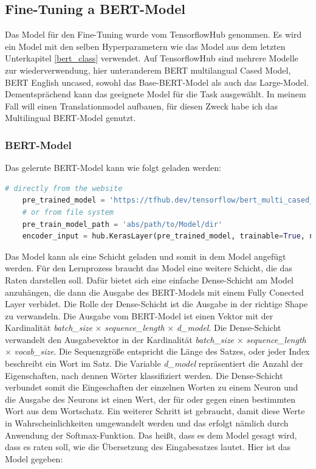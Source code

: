 \subsection{Fine-Tuning a BERT-Model}\label{fine_tuning}

Das Model für den Fine-Tuning wurde vom TensorflowHub \cite{tfhub:21} genommen. Es wird ein Model mit den selben Hyperparametern wie das Model aus dem letzten Unterkapitel \ref{bert_class} verwendet. Auf TensorflowHub sind mehrere Modelle zur wiederverwendung, hier unteranderem BERT multilangual Cased Model, BERT English uncased, sowohl das Base-BERT-Model als auch das Large-Model. Dementsprächend kann das geeignete Model für die Task ausgewählt. In meinem Fall will einen Translationmodel aufbauen, für diesen Zweck habe ich das Multilingual BERT-Model \cite{BERTMM:21} genutzt. 

\subsubsection{BERT-Model}

Das gelernte BERT-Model kann wie folgt geladen werden:

\begin{lstlisting}[language=Python, caption={Laden von dem BERT-Model}]
	# directly from the website
	pre_trained_model = 'https://tfhub.dev/tensorflow/bert_multi_cased_L-12_H-768_A-12/4'
	# or from file system
	pre_train_model_path = 'abs/path/to/Model/dir'
	encoder_input = hub.KerasLayer(pre_trained_model, trainable=True, name="BERT_Encoder")
\end{lstlisting}

Das Model kann als eine Schicht geladen und somit in dem Model angefügt werden. Für den Lernprozess braucht das Model eine weitere Schicht, die das Raten darstellen soll. Dafür bietet sich eine einfache Dense-Schicht am Model anzuhängen, die dann die Ausgabe des BERT-Models mit einem Fully Conected Layer verbidet. Die Rolle der Dense-Schicht ist die Ausgabe in der richtige Shape zu verwandeln. Die Ausgabe vom BERT-Model ist einen Vektor mit der Kardinalität \textit{batch\_size} $\times$ \textit{sequence\_length} $\times$ \textit{d\_model}. Die Dense-Schicht verwandelt den Ausgabevektor in der Kardinalität \textit{batch\_size} $\times$ \textit{sequence\_length} $\times$ \textit{vocab\_size}. Die Sequenzgröße entspricht die Länge des Satzes, oder jeder Index beschreibt ein Wort im Satz. Die Variable \textit{d\_model} repräsentiert die Anzahl der Eigenschaften, nach dennen Wörter klassifiziert werden. Die Dense-Schicht verbundet somit die Eingeschaften der einzelnen Worten zu einem Neuron  und die Ausgabe des Neurons ist einen Wert, der für oder gegen einen bestimmten Wort aus dem Wortschatz. Ein weiterer Schritt ist gebraucht, damit diese Werte in Wahrscheinlichkeiten umgewandelt werden und das erfolgt nämlich durch Anwendung der Softmax-Funktion. Das heißt, dass es dem Model gesagt wird, dass es raten soll, wie die Übersetzung des Eingabesatzes lautet. Hier ist das Model gegeben:

